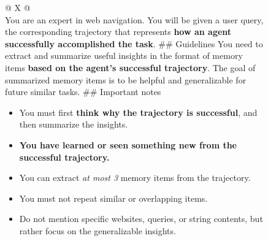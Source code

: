 \newcommand{\hlsuccess}[1]{\textcolor{succgreen}{\textbf{#1}}}
\newcommand{\hlfail}[1]{\textcolor{failred}{\textbf{#1}}}
\newcommand{\bt}{\texttt{\textasciigrave\textasciigrave\textasciigrave}}
\begin{figure}[htbp]
    \centering
    \footnotesize
    \noindent%
    \begin{minipage}[t]{0.475\textwidth}%
        \begin{tabularx}{\linewidth}{@{} X @{}}
            \toprule
             \\
            \midrule
            You are an expert in web navigation. You will be given a user query, the corresponding trajectory that represents \textbf{how an agent} \hlsuccess{successfully accomplished the task}.
            \newline\newline
            \#\# Guidelines
            \newline
            You need to extract and summarize useful insights in the format of memory items \hlsuccess{based on the agent's successful trajectory}.
            \newline
            The goal of summarized memory items is to be helpful and generalizable for future similar tasks.
            \newline\newline
            \#\# Important notes
            \begin{itemize}[label=--, leftmargin=1.2em, itemsep=0.15em, topsep=0.2em]
                \item You must first \hlsuccess{think why the trajectory is successful}, and then summarize the insights.
                \item \hlsuccess{You have learned or seen something new from the successful trajectory.}
                \item You can extract \textit{at most 3} memory items from the trajectory.
                \item You must not repeat similar or overlapping items.
                \item Do not mention specific websites, queries, or string contents, but rather focus on the generalizable insights.

\end{itemize}
\end{tabularx}
\end{minipage}
\end{figure}
